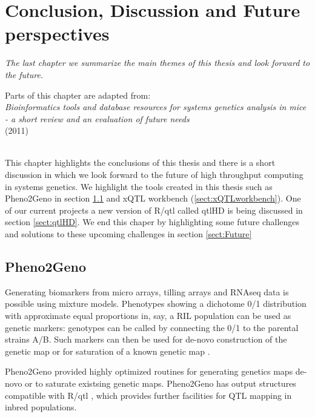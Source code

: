 \chapter{Conclusion, Discussion and Future perspectives}
\thispagestyle{empty}
\emph{The last chapter we summarize the main themes of this thesis and look forward to the future.}
\null
\vfill

\begin{myexampleblock}{Parts of this chapter are adapted from:}
  \\
  \emph{ Bioinformatics tools and database resources for systems genetics analysis in mice 
         - a short review and an evaluation of future needs}\\
   (2011)\\\\
\end{myexampleblock}

\newpage

This chapter highlights the conclusions of this thesis and there is a short discussion in 
which we look forward to the future of high throughput computing in systems genetics. We 
highlight the tools created in this thesis such as Pheno2Geno in section \ref{sect:Pheno2Geno} and xQTL 
workbench (\ref{sect:xQTLworkbench}). One of our current projects a new version of R/qtl called qtlHD 
is being discussed in section \ref{sect:qtlHD}. We end this chaper by highlighting some future challenges 
and solutions to these upcoming challenges in section \ref{sect:Future}

\section{Pheno2Geno}
\label{sect:Pheno2Geno}
Generating biomarkers from micro arrays, tilling arrays and RNAseq data is possible using 
mixture models. Phenotypes showing a dichotome 0/1 distribution with approximate equal 
proportions in, say, a RIL population can be used as genetic markers: genotypes can be 
called by connecting the 0/1 to the parental strains A/B. Such markers can then be used 
for de-novo construction of the genetic map or for saturation of a known genetic map 
\cite{West:2006, Truco:2013}.

Pheno2Geno provided highly optimized routines for generating genetics maps de-novo or to 
saturate existsing genetic maps. Pheno2Geno has output structures compatible with R/qtl 
\cite{Broman:2003, Arends:2010}, which provides further facilities for QTL mapping in 
inbred populations.

